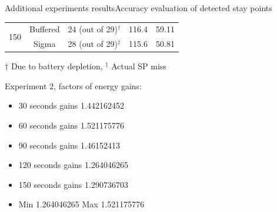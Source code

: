 \documentclass[8pt,xcolor={dvipsnames},handout]{beamer}
\begin{document}
\begin{frame}{Additional experiments results}{Accuracy evaluation of detected stay points}
\begin{table}
{\begin{tabular}{@{}ccccc@{}}
\multirow{2}{*}{150} & Buffered & 24 (out of 29)$^\dagger$ & 116.4 & 59.11 \\
 & Sigma & 28 (out of 29)$^\ddagger$ & 115.6 & 50.81 \\

\bottomrule
\end{tabular}%
}

{\scriptsize $\dagger$ Due to battery depletion, $^\ddagger$ Actual SP miss}

\end{table}
{
\scriptsize{}
Experiment 2, factors of energy gains:
\begin{itemize}
  \item 30 seconds gains  1.442162452
  \item 60 seconds gains  1.521175776
  \item 90 seconds gains  1.46152413
  \item 120 seconds gains 1.264046265
  \item 150 seconds gains 1.290736703
  \item Min 1.264046265 Max 1.521175776
\end{itemize}
}
\end{frame}
\end{document}
